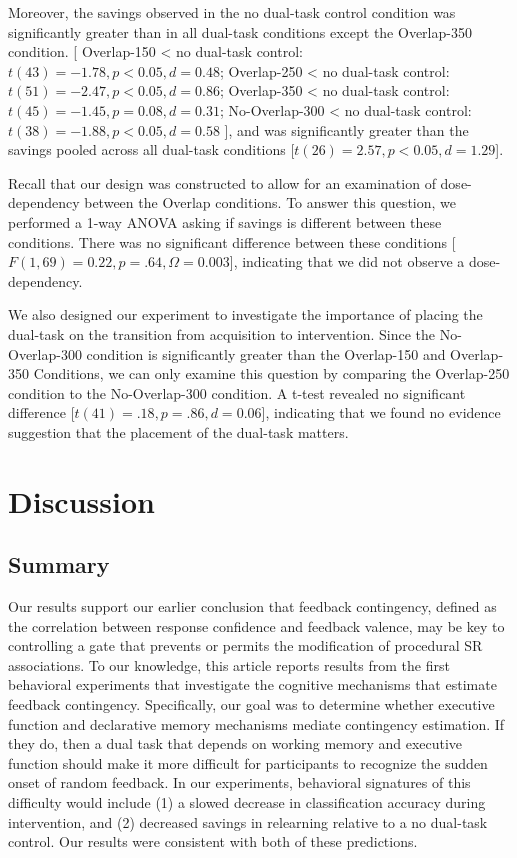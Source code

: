 \documentclass[apacite,draftfirst,man]{apa6}
\begin{document}
Moreover, the savings observed in the no dual-task control condition was
significantly greater than in all dual-task conditions except the Overlap-350
condition.
[
Overlap-150 < no dual-task control: $t(43) = -1.78, p < 0.05, d = 0.48$;
Overlap-250 < no dual-task control: $t(51) = -2.47, p < 0.05, d = 0.86$;
Overlap-350 < no dual-task control: $t(45) = -1.45, p = 0.08, d = 0.31$;
No-Overlap-300 < no dual-task control: $t(38) = -1.88, p < 0.05, d = 0.58$
], and was significantly greater than the savings pooled across all dual-task
conditions [$t(26) = 2.57, p < 0.05, d = 1.29$].

Recall that our design was constructed to allow for an examination of
dose-dependency between the Overlap conditions. To answer this question, we
performed a 1-way ANOVA asking if savings is different between these conditions.
There was no significant difference between these conditions [$F(1,69) = 0.22, p
= .64, \Omega = 0.003$], indicating that we did not observe a dose-dependency.

We also designed our experiment to investigate the importance of placing the
dual-task on the transition from acquisition to intervention. Since the
No-Overlap-300 condition is significantly greater than the Overlap-150 and
Overlap-350 Conditions, we can only examine this question by comparing the
Overlap-250 condition to the No-Overlap-300 condition. A t-test revealed no
significant difference [$t(41) = .18, p = .86, d = 0.06$], indicating that we
found no evidence suggestion that the placement of the dual-task matters.

\section*{Discussion}
\subsection*{Summary}
Our results support our earlier conclusion \cite{crossley_erasing_2013} that
feedback contingency, defined as the correlation between response confidence and
feedback valence, may be key to controlling a gate that prevents or permits the
modification of procedural SR associations. To our knowledge, this article
reports results from the first behavioral experiments that investigate the
cognitive mechanisms that estimate feedback contingency. Specifically, our goal
was to determine whether executive function and declarative memory mechanisms
mediate contingency estimation. If they do, then a dual task that depends on
working memory and executive function should make it more difficult for
participants to recognize the sudden onset of random feedback. In our
experiments, behavioral signatures of this difficulty would include (1) a slowed
decrease in classification accuracy during intervention, and (2) decreased
savings in relearning relative to a no dual-task control. Our results were
consistent with both of these predictions.
\end{document}

